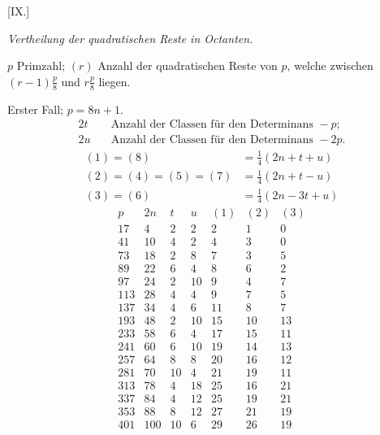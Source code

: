 \par\bigskip{}\centerline{[IX.]}\medskip
\begin{center}\emph{Vertheilung der quadratischen Reste in Octanten.}\end{center}
$p$ Primzahl; $(r)$ Anzahl der quadratischen Reste von $p$, welche zwischen $(r-1)\frac p8$ und $r\frac p8$ liegen.

Erster Fall; $p=8n+1$.
\[
\begin{aligned}
2t&\quad\text{Anzahl der Classen für den Determinans }-p;\\
2u&\quad\text{Anzahl der Classen für den Determinans }-2p.
\end{aligned}
\]
\[
\begin{aligned}
(1)=(8)&=\tfrac14(2n+t+u)\\
(2)=(4)=(5)=(7)&=\tfrac14(2n+t-u)\\
(3)=(6)&=\tfrac14(2n-3t+u)
\end{aligned}
\]
\[
\begin{array}{r|r|r|r|r|r|r}
p&2n&t&u&(1)&(2)&(3)\\\hline
17&4&2&2&2&1&0\\
41&10&4&2&4&3&0\\
73&18&2&8&7&3&5\\
89&22&6&4&8&6&2\\
97&24&2&10&9&4&7\\
113&28&4&4&9&7&5\\
137&34&4&6&11&8&7\\
193&48&2&10&15&10&13\\
233&58&6&4&17&15&11\\
241&60&6&10&19&14&13\\
257&64&8&8&20&16&12\\
281&70&10&4&21&19&11\\
313&78&4&18&25&16&21\\
337&84&4&12&25&19&21\\
353&88&8&12&27&21&19\\
401&100&10&6&29&26&19
\end{array}
\]

